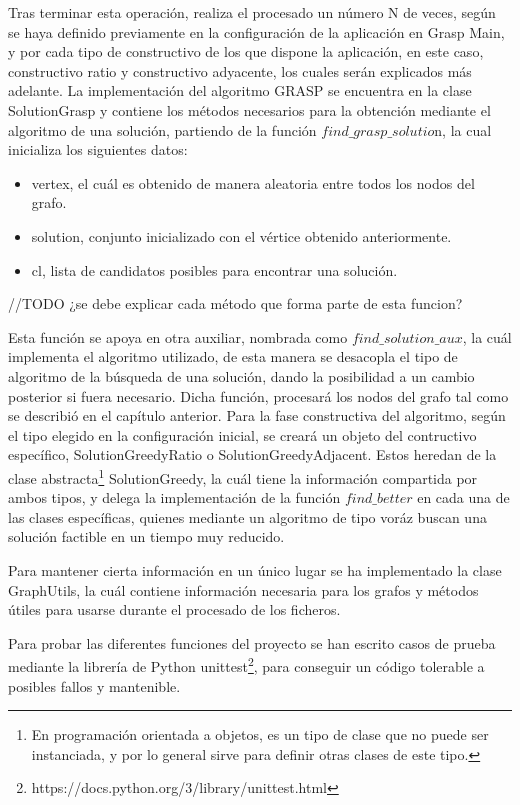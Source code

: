 Tras terminar esta operación, realiza el procesado un número N de veces, según se haya definido previamente en la configuración de la aplicación en Grasp Main, y por cada tipo de constructivo de los que dispone la aplicación, en este caso, constructivo ratio y constructivo adyacente, los cuales serán explicados más adelante. 
La implementación del algoritmo \gls{GRASP} se encuentra en la clase SolutionGrasp y contiene los métodos necesarios para la obtención mediante el algoritmo de una solución, partiendo de la función $find\_grasp\_solutio$n, la cual inicializa los siguientes datos:
\begin{itemize}
	\item vertex, el cuál es obtenido de manera aleatoria entre todos los nodos del grafo.
	\item solution, conjunto inicializado con el vértice obtenido anteriormente.
	\item cl, lista de candidatos posibles para encontrar una solución.
\end{itemize}

//TODO ¿se debe explicar cada método que forma parte de esta funcion?

Esta función se apoya en otra auxiliar, nombrada como $ find\_solution\_aux $, la cuál implementa el algoritmo utilizado, de esta manera se desacopla el tipo de algoritmo de la búsqueda de una solución, dando la posibilidad a un cambio posterior si fuera necesario. Dicha función, procesará los nodos del grafo tal como se describió en el capítulo anterior. Para la fase constructiva del algoritmo, según el tipo elegido en la configuración inicial, se creará un objeto del contructivo específico, SolutionGreedyRatio o SolutionGreedyAdjacent. Estos heredan de la clase abstracta\footnote{En programación orientada a objetos, es un tipo de clase que no puede ser instanciada, y por lo general sirve para definir otras clases de este tipo.} SolutionGreedy, la cuál tiene la información compartida por ambos tipos, y delega la implementación de la función $find\_better$ en cada una de las clases específicas, quienes mediante un algoritmo de tipo voráz buscan una solución factible en un tiempo muy reducido.

Para mantener cierta información en un único lugar se ha implementado la clase GraphUtils, la cuál contiene información necesaria para los grafos y métodos útiles para usarse durante el procesado de los ficheros.

Para probar las diferentes funciones del proyecto se han escrito casos de prueba mediante la librería de Python unittest\footnote{https://docs.python.org/3/library/unittest.html}, para conseguir un código tolerable a posibles fallos y mantenible.

